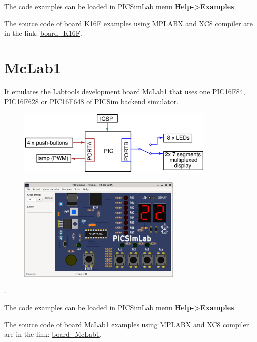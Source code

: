 The code examples can be loaded in PICSimLab menu \textbf{Help->Examples}.

The source code of board K16F examples using \href{http://www.microchip.com/mplabx}{MPLABX and XC8} compiler are in
the link: \href{https://lcgamboa.github.io/picsimlab_examples/board_K16F.html}{board\_K16F}.



\section{McLab1}

It emulates the Labtools development board McLab1 that uses one PIC16F84, PIC16F628 or PIC16F648 
of \hyperlink{def:PICSim}{PICSim backend simulator}.

\begin{figure}[H]
\center
\includegraphics[width=0.85\textwidth]{img/blocks_p1.eps} 
\end{figure} 


\begin{figure}[H]
\center
\includegraphics[width=0.7\textwidth]{img/picsimlab1.png} 
\end{figure} 

.\vspace{0.5cm}

The code examples can be loaded in PICSimLab menu \textbf{Help->Examples}.

The source code of board McLab1 examples using \href{http://www.microchip.com/mplabx}{MPLABX and XC8} compiler 
are in the link: \href{https://lcgamboa.github.io/picsimlab_examples/board_McLab1.html}{board\_McLab1}.


